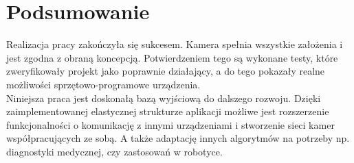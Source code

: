 \chapter{Podsumowanie} 

Realizacja pracy zakończyła się sukcesem. Kamera spełnia wszystkie założenia i jest zgodna z obraną koncepcją. Potwierdzeniem tego są wykonane testy, które zweryfikowały projekt jako poprawnie działający, a do tego pokazały realne możliwości sprzętowo-programowe urządzenia.\\
Niniejsza praca jest doskonałą bazą wyjściową do dalszego rozwoju. Dzięki zaimplementowanej elastycznej strukturze aplikacji możliwe jest rozszerzenie funkcjonalności o komunikację z innymi urządzeniami i stworzenie sieci kamer współpracujących ze sobą. A także adaptację innych algorytmów na potrzeby np. diagnostyki medycznej, czy zastosowań w robotyce.